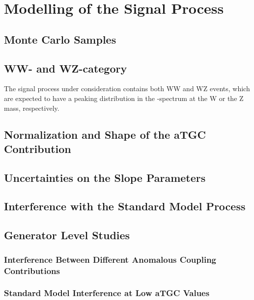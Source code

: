 \chapter{Modelling of the Signal Process}
\label{chap::ModellingoftheSignalProcess}

\section{Monte Carlo Samples}
\section{WW- and WZ-category}
The signal process under consideration contains both WW and WZ events, which are expected to have a peaking distribution in the \Mpr -spectrum at the W or the Z mass, respectively.
\section{Normalization and Shape of the aTGC Contribution}
\section{Uncertainties on the Slope Parameters}
\section{Interference with the Standard Model Process}
\section{Generator Level Studies}
\subsection{Interference Between Different Anomalous Coupling Contributions}
\subsection{Standard Model Interference at Low aTGC Values}
